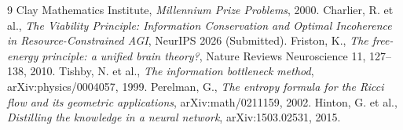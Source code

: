 \documentclass[11pt,a4paper]{amsart}
\begin{document}
\begin{thebibliography}{9}
 Clay Mathematics Institute, \emph{Millennium Prize Problems}, 2000.
 Charlier, R. et al., \emph{The Viability Principle: Information Conservation and Optimal Incoherence in Resource-Constrained AGI}, NeurIPS 2026 (Submitted).
 Friston, K., \emph{The free-energy principle: a unified brain theory?}, Nature Reviews Neuroscience 11, 127--138, 2010.
 Tishby, N. et al., \emph{The information bottleneck method}, arXiv:physics/0004057, 1999.
 Perelman, G., \emph{The entropy formula for the Ricci flow and its geometric applications}, arXiv:math/0211159, 2002.
 Hinton, G. et al., \emph{Distilling the knowledge in a neural network}, arXiv:1503.02531, 2015.
\end{thebibliography}
\end{document}

